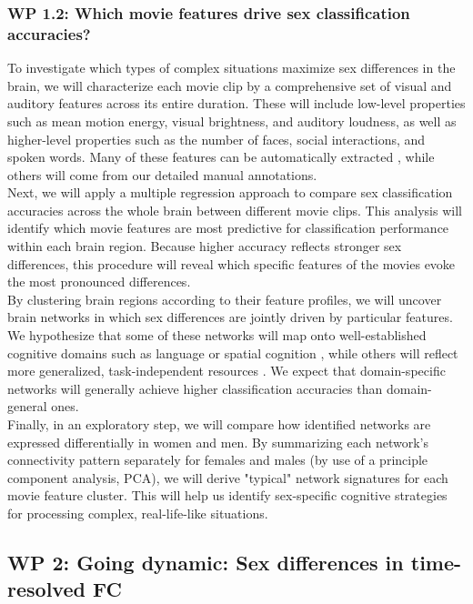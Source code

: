 \documentclass[11pt,a4paper]{article}
\begin{document}
\subsubsection*{WP 1.2: Which movie features drive sex classification accuracies?}
To investigate which types of complex situations maximize sex differences in the brain, we will characterize each movie clip by a 
comprehensive set of visual and auditory features across its entire duration. These will include low-level 
properties such as mean motion energy, visual brightness, and auditory loudness, as well as higher-level properties such as the 
number of faces, social interactions, and spoken words. Many of these features can be automatically 
extracted \parencite{mcnamaraDevelopingComprehensiveFramework2017a,radfordRobustSpeechRecognition2022}, while others will come 
from our detailed manual annotations.\\
Next, we will apply a multiple regression approach to compare sex classification accuracies across the whole brain between 
different movie clips. This analysis will identify which movie features are most predictive for classification performance within 
each brain region. Because higher accuracy reflects stronger sex differences, this procedure will reveal which specific 
features of the movies evoke the most pronounced differences.\\
By clustering brain regions according to their feature profiles, we will uncover brain networks in which sex differences are jointly 
driven by particular features. We hypothesize that some of these networks will map onto well-established cognitive domains such as 
language or spatial cognition \parencite{halpernSexDifferencesCognitive2000a,kimuraSexCognition2000a}, while others will 
reflect more generalized, task-independent resources \parencite{hugdahlExistenceGeneralizedNonspecific2015a}. 
We expect that domain-specific networks will generally achieve higher classification accuracies than domain-general ones.\\
Finally, in an exploratory step, we will compare how identified networks are expressed differentially in women and men. 
By summarizing each network's connectivity pattern separately for females and males (by use of a principle component analysis, PCA), we 
will derive "typical" network signatures
for each movie feature cluster. This will help us identify sex-specific cognitive strategies for processing complex, 
real-life-like situations.

\subsection*{WP 2: Going dynamic: Sex differences in time-resolved FC}
\end{document}
